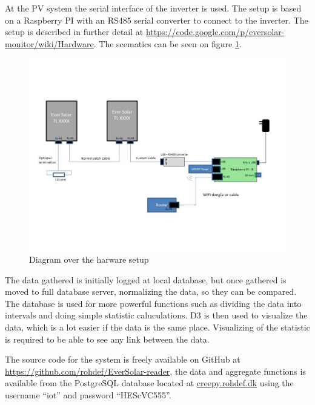 At the PV system the serial interface of the inverter is used.  The
setup is based on a Raspberry PI with an RS485 serial converter to
connect to the inverter.  The setup is described in further detail at
\url{https://code.google.com/p/eversolar-monitor/wiki/Hardware}.  The
scematics can be seen on figure \ref{fig:hardware}.

\begin{figure}[h]
  \centering
  \includegraphics{hardware.jpg}
  \caption{Diagram over the harware setup}
  \label{fig:hardware}
\end{figure}

The data gathered is initially logged at local database, but once
gathered is moved to full database server, normalizing the data, so
they can be compared.  The database is used for more powerful
functions such as dividing the data into intervals and doing simple
statistic caluculations.
D3 is then used to visualize the data, which is a lot easier if the data 
is the same place. Visualizing of the statistic is required to be able to 
see any link between the data.

The source code for the system is freely available on GitHub at
\url{https://github.com/rohdef/EverSolar-reader}, the data and
aggregate functions is available from the PostgreSQL database located
at \url{creepy.rohdef.dk} using the username ``iot'' and password
``HEScVC555''.

